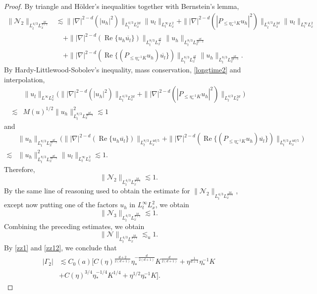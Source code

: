 \documentclass[reqno,11pt]{amsart}
\theoremstyle{plain}
\theoremstyle{definition}
\numberwithin{equation}{section}
\numberwithin{theorem}{section}
\def\leq{\leqslant}
\begin{document}
\begin{proof}
By triangle and H\"older's inequalities together with Bernstein's lemma,
\begin{align*}
    \|\mathcal{N}_{2}\|_{L_{t}^{4/3}L_{x}^{\frac{2d}{d+1}}}
&\lesssim \| |\nabla|^{2-d}(|u_{h}|^{2})\|_{L_{t}^{4/3}L_{x}^{2d}}\| u_{l}\|_{L_{t}^{\infty}L_{x}^{2}}
+ \| |\nabla|^{2-d}(|P_{\leq \eta_{\ast}^{-1}K}u_{h}|^{2})\|_{L_{t}^{4/3}L_{x}^{2d}}\| u_{l}\|_{L_{t}^{\infty}L_{x}^{2}} \\
&\quad +\| |\nabla|^{2-d}(\operatorname{Re}\{u_{h}\overline{u_{l}}\})\|_{L_{t}^{8/3}L_{x}^{\frac{4d}{5}}}\| u_{h}\|_{L_{t}^{8/3}L_{x}^{\frac{4d}{2d-3}}} \\
&\quad +\| |\nabla|^{2-d}(\operatorname{Re}\{(P_{\leq \eta_{\ast}^{-1}K}u_{h})\overline{u_{l}}\})\|_{L_{t}^{8/3}L_{x}^{\frac{4d}{5}}}\| u_{h}\|_{L_{t}^{8/3}L_{x}^{\frac{4d}{2d-3}}}. 
\end{align*}
By Hardy-Littlewood-Sobolev's inequality, mass conservation, \eqref{longtime2} and interpolation,
\[
\begin{aligned}
&\| u_{l}\|_{L^{\infty}L_{x}^{2}}\Big(\| |\nabla|^{2-d}(|u_{h}|^{2})\|_{L_{t}^{4/3}L_{x}^{2d}}
+ \| |\nabla|^{2-d}(|P_{\leq \eta_{\ast}^{-1}K}u_{h}|^{2})\|_{L_{t}^{4/3}L_{x}^{2d}}\Big) \\
\lesssim& M(u)^{1/2}\| u_{h}\|_{L_{t}^{8/3}L_{x}^{\frac{4d}{2d-3}}}^{2} 
\lesssim 1
\end{aligned}
\]
 and
\[
\begin{aligned}
&\| u_{h}\|_{L_{t}^{8/3}L_{x}^{\frac{4d}{2d-3}}}\Big(\| |\nabla|^{2-d}(\operatorname{Re}\{u_{h}\overline{u_{l}}\})\|_{L_{t}^{8/3}L_{x}^{4d/5}}
+ \| |\nabla|^{2-d}(\operatorname{Re}\{(P_{\leq \eta_{\ast}^{-1}K}u_{h})\overline{u_{l}}\})\|_{L_{t}^{8/3}L_{x}^{4d/5}}\Big) \\
\lesssim& \| u_{h}\|_{L_{t}^{8/3}L_{x}^{\frac{4d}{2d-3}}}^{2}\| u_{l}\|_{L_{t}^{\infty}L_{x}^{2}}
\lesssim 1.
\end{aligned}
\]
Therefore,
\[
\|\mathcal{N}_{2}\|_{L_{t}^{4/3}L_{x}^{\frac{2d}{d+1}}}\lesssim 1 .
\]
By the same line of reasoning used to obtain the estimate for $\|\mathcal{N}_{2}\|_{L_{t}^{4/3}L_{x}^{\frac{2d}{d+1}}}$, except now putting one of the factors $u_{h}$ in $L_{t}^{\infty}L_{x}^{2}$, we obtain
\[
\|\mathcal{N}_{3}\|_{L_{t}^{4/3}L_{x}^{\frac{2d}{d+1}}}\lesssim 1. 
\]
Combining the preceding estimates, we obtain
\[
 \|\mathcal N\|_{L_t^{4/3}L_x^{\frac{2d}{d+1}}}\lesssim_u1.
\]
By \eqref{zz1} and \eqref{zz12}, we conclude that
\begin{align*}
   \left| \Gamma_2\right| &\lesssim C_0(a)[C(\eta)^{\frac{d+2}{2(d+1)}}\eta_{\ast}^{-\frac{d}{2(d+1)}}K^{\frac{d}{2(d+1)}}+\eta^{\frac{1}{d+1}}\eta_{\ast}^{-1}K\\
    &+ C(\eta)^{3/4}\eta_{\ast}^{-1/4}K^{1/4}+\eta^{1/2}\eta_{\ast}^{-1}K].
\end{align*}


\end{proof}
\end{document}
